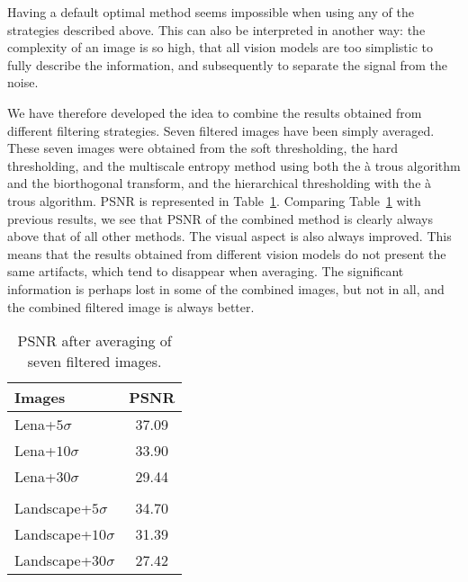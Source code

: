 Having a default optimal method seems impossible when using any of the
strategies described above. This can also be interpreted in another 
way: the complexity of an image is so high, that all vision models 
are too simplistic to fully describe the information, and subsequently to 
separate
the signal from the noise. 

We have therefore developed the idea to combine 
the results obtained from different filtering strategies. Seven filtered
images have been simply averaged. These seven images were obtained from
the soft thresholding, the hard thresholding, and the multiscale entropy method
using both the \`a trous algorithm and the biorthogonal transform,
 and the hierarchical thresholding with the \`a trous algorithm.
PSNR is represented in Table~\ref{comptab3}. Comparing Table~\ref{comptab3}
with previous results, we see that PSNR of the combined method
is clearly always above that of all other methods. The visual aspect is 
also always
improved. This means that the results obtained from different vision models
do not present the same artifacts, which tend to disappear when  
averaging. The significant information is perhaps lost in some of the 
combined images,
but not in all, and the combined filtered image is always better.

\begin{table}[hbt]
\begin{center}
\begin{tabular}{lc} \hline \hline
Images              &  PSNR    \\ \hline \hline
 Lena+$5\sigma$    &   37.09  \\
 Lena+$10\sigma$   &   33.90  \\
 Lena+$30\sigma$   &   29.44  \\
                    &          \\
  Landscape+$5\sigma$   &  34.70          \\
  Landscape+$10\sigma$   & 31.39          \\
  Landscape+$30\sigma$   &   27.42        \\ \hline \hline
\end{tabular}
\caption{PSNR after averaging of seven filtered images.}
\vspace{0.5cm}
\label{comptab3}
\end{center}
\end{table}




